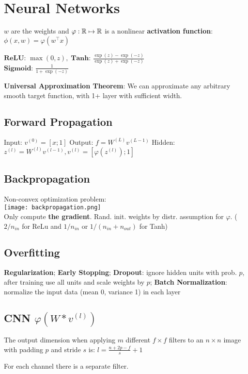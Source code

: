 \section*{Neural Networks}
$w$ are the weights and $\varphi: \mathbb{R} \mapsto \mathbb{R}$ is a nonlinear \textbf{activation function}: $\phi(x, w) = \varphi(w^\top x)$


$\textbf{ReLU: } \max (0,z), \; \textbf{Tanh: } \frac{\exp(z) - \exp(-z)}{\exp(z) + \exp(-z)}$ \\[-3pt]
$\textbf{Sigmoid: } \frac{1}{1 + \exp(-z)}$


\textbf{Universal Approximation Theorem}: We can approximate any arbitrary smooth target function, with 1+ layer with sufficient width.

\subsection*{Forward Propagation}

Input: $v^{(0)} = [x; 1]$ \quad Output: $f = W^{(L)} v^{(L-1)}$
Hidden: $z^{(l)} = W^{(l)} v^{(l-1)}, v^{(l)} = [\varphi(z^{(l)}); 1]$


\subsection*{Backpropagation}

Non-convex optimization problem: \\[-10pt]

\texttt{[image: backpropagation.png]} \\[-15pt]

Only compute \color{Red} \textbf{the gradient}\color{Black}. Rand. init. weights by distr. assumption for $\varphi$. ( $2 / n_{in}$ for ReLu and $1/n_{in}$ or $ 1/ (n_{in} + n_{out})$ for Tanh)

\subsection*{Overfitting}
\textbf{Regularization}; \textbf{Early Stopping}; \textbf{Dropout}: ignore hidden units with prob. $p$, after training use all units and scale weights by $p$; \textbf{Batch Normalization}: normalize the input data (mean 0, variance 1) in each layer

\subsection*{CNN \quad \color{Black}$\varphi(W * v^{(l)})$}

The output dimension when applying $m$ different $f \times f$ filters to an $n \times n$ image with padding $p$ and stride $s$ is: $l = \frac{n + 2p - f}{s} + 1$

For each channel there is a separate filter.